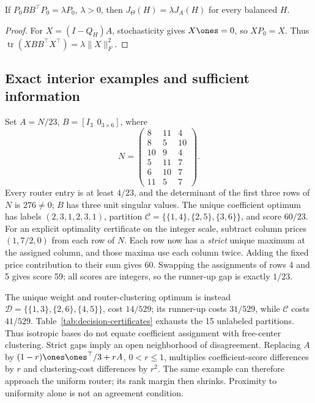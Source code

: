 \begin{proposition}
\label{prop:simplex-isotropy}
If $P_0BB^\top P_0=\lambda P_0$, $\lambda>0$, then
$J_\Theta(H)=\lambda J_A(H)$ for every balanced $H$.
\end{proposition}
\begin{proof}
For $X=(I-Q_H)A$, stochasticity gives $X\ones=0$, so $XP_0=X$.
Thus $\operatorname{tr}(XBB^\top X^\top)=\lambda\|X\|_F^2$.
\end{proof}

\subsection{Exact interior examples and sufficient information}
\label{app:decision-examples}

Set $A=N/23$, $B=[I_3\ \ 0_{3\times6}]$, where
\begin{equation}
 N=\begin{pmatrix}
 8&11&4\\8&5&10\\10&9&4\\5&11&7\\6&10&7\\11&5&7
 \end{pmatrix}. \label{eq:decision-counter-matrix}
\end{equation}
Every router entry is at least $4/23$, and the determinant of the first
three rows of $N$ is $276\ne0$; $B$ has three unit singular values.
The unique coefficient optimum has labels $(2,3,1,2,3,1)$, partition
$\mathcal C=\{\{1,4\},\{2,5\},\{3,6\}\}$, and score $60/23$.
For an explicit optimality certificate on the integer scale, subtract
column prices $(1,7/2,0)$ from each row of $N$. Each row now has a
\emph{strict} unique maximum at the assigned column, and those maxima
use each column twice. Adding the fixed price contribution to their sum
gives 60. Swapping the assignments of rows 4 and 5 gives score 59;
all scores are integers, so the runner-up gap is exactly $1/23$.

The unique weight and router-clustering optimum is instead
$\mathcal D=\{\{1,3\},\{2,6\},\{4,5\}\}$, cost $14/529$;
its runner-up costs $31/529$, while $\mathcal C$ costs $41/529$.
Table~\ref{tab:decision-certificates} exhausts the 15 unlabeled partitions.
Thus isotropic bases do not equate coefficient assignment with free-center
clustering. Strict gaps imply an open neighborhood of disagreement.
Replacing $A$ by $(1-r)\ones\ones^\top/3+rA$, $0<r\le1$, multiplies
coefficient-score differences by $r$ and clustering-cost differences by
$r^2$. The same example can therefore approach the uniform router;
its rank margin then shrinks. Proximity to uniformity alone is not an
agreement condition.

